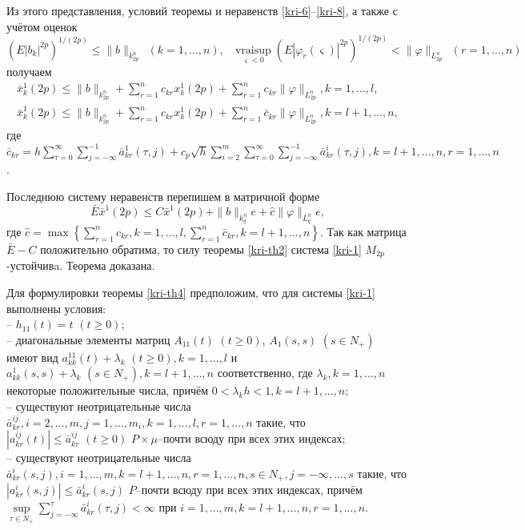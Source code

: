 Из этого представления, условий теоремы и неравенств \eqref{kri-6}--\eqref{kri-8},  а
также с учётом оценок $$(E|b_k|^{2p})^{1/(2p)} \leq \|b\|_{k^n_{2p}}
\ \ (k=1,...,n), \ \ \ \mathrel {\mathop {vrai \sup} \limits
_{\varsigma < 0}}(E|\varphi _r(\varsigma )|^{2p})^{1/(2p)} <
\|\varphi  \|_{L_{2p}^n} \ \ (r=1,...,n)$$ получаем
$$
\begin{array}{crl}
\bar x^1_k(2p) \leq \|b\|_{k^n_{2p}} + \sum \limits
_{r=1}^{n}c_{kr}x^1_k(2p) +
\sum \limits_{r=1}^{n}c_{kr} \|\varphi \|_{L_{2p}^n}, k = 1, ... ,l,\\
\bar x^1_k(2p) \leq \|b\|_{k^n_{2p}} + \sum
\limits_{r=1}^{n}c_{kr}x^1_k(2p) + \sum \limits_{r=1}^{n}\bar
c_{kr}\|\varphi  \|_{L_{2p}^n}, k = l + 1, ... ,n,
\end {array}
$$
где $\bar c_{kr} = h\sum \limits _{\tau=0 }^{\infty }\sum \limits
_{j=-\infty }^{-1}\bar a^{1}_{kr}(\tau,j) + c_p \sqrt{h}\sum \limits
_{i=2}^{m}\sum \limits _{\tau=0 }^{\infty }\sum \limits _{j=-\infty
}^{-1} \bar a^{i}_{kr}(\tau,j), k = l+1, ...,n, r = 1, ..., n$.

Последнюю систему неравенств перепишем в матричной форме
$$
\bar E\bar x^1 (2p) \leq C\bar x^1 (2p) + \|b\|_{k^n_{q}}e +
\hat c \|\varphi \|_{L^n_q} e,
$$
где $\hat c = \max \left \{ \sum \limits_{r=1}^{n}c_{kr}, k = 1, ...
,l, \sum \limits_{r=1}^{n}\bar c_{kr}, k = l + 1, ... ,n \right \}$.
Так как матрица  $\bar E - C$ положительно обратима, то силу теоремы
\ref{kri-th2} система \eqref{kri-1} $M_{2p}$-устойчивa. Теорема доказана.

Для формулировки теоремы \ref{kri-th4} предположим, что для системы \eqref{kri-1}
выполнены условия:\\
\noindent
  -- $h_{11}(t) = t \,\,
(t \geq 0)$;\\
  -- диагональные элементы матриц $A_{11}(t)\,\, (t \geq
0)$, $A_1(s,s) \,\, (s \in N_+)$ имеют вид $a_{kk}^{11}(t) + \lambda
_k \,\, (t \geq 0), k=1, ..., l$ и $a_{kk}^{1}(s,s) + \lambda _k
\,\, (s \in N_+), k=l + 1, ..., n$ соответственно, где $\lambda _k,
k = 1, ..., n$ некоторые положительные числа, причём $0 < \lambda
_kh < 1, k = l + 1, ..., n$;\\
  -- существуют  неотрицательные числа  $\bar
a^{ij}_{kr}, i = 2,...,m, j = 1,...,m_i, k =1,...,l, r = 1,...,n$
 такие, что $|a^{ij}_{kr}(t)|\leq \bar
a^{ij}_{kr} \,\, (t\geq 0) $ $P\times\mu$--почти всюду при всех этих
индексах;\\
  -- существуют  неотрицательные числа
$\bar a^i_{kr}(s,j),i=1,...,m, k = l+1, ..., n, r = 1,...,n, s\in
N_+, j=-\infty,...,s$ такие, что  $|a^i_{kr}(s,j)| \leq \bar
a^i_{kr}(s,j)$ $P$--почти всюду при всех этих индексах, причём $
\mathrel {\mathop {\sup} \limits _{\tau \in N_+ }} \sum \limits
_{j=-\infty }^{\tau}\bar a^{i}_{kr}(\tau,j) < \infty$ при
$i=1,...,m, k = l+1, ..., n, r = 1,...,n$.

